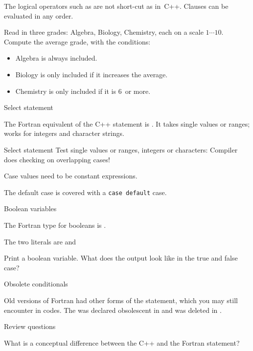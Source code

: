 The logical operators such as  are not short-cut as
in~C++. Clauses can be evaluated in any order.

\begin{exercise}
  \label{ex:fgrades}
  Read in three grades: Algebra, Biology, Chemistry, each on a scale
  $1\cdots 10$. Compute the average grade, with the conditions:
  \begin{itemize}
  \item Algebra is always included.
  \item Biology is only included if it increases the average.
  \item Chemistry is only included if it is 6~or more.
  \end{itemize}
\end{exercise}

 {Select statement}

The Fortran equivalent of the C++  statement is . It takes
single values or ranges; works for integers and character strings.

\begin{block}{Select statement}
  \label{sl:fswitch}
  Test single values or ranges, integers or characters:
  Compiler does checking on overlapping cases!

  Case values need to be constant expressions.
\end{block}

The default case is covered with a \lstinline{case default} case.

 {Boolean variables}

The Fortran type for booleans is .

The two literals are  and 

\begin{exercise}
  \label{ex:fprintbool}
  Print a boolean variable. What does the output look like in the true
  and false case?
\end{exercise}

 {Obsolete conditionals}

Old versions of Fortran had other forms of the  statement,
which you may still encounter in codes.
The  was declared obsolescent
in  and was deleted in .

 {Review questions}

\begin{exercise}
  \label{ex:select-vs-switch}
  What is a conceptual difference between the C++  and the
  Fortran  statement?
\end{exercise}
